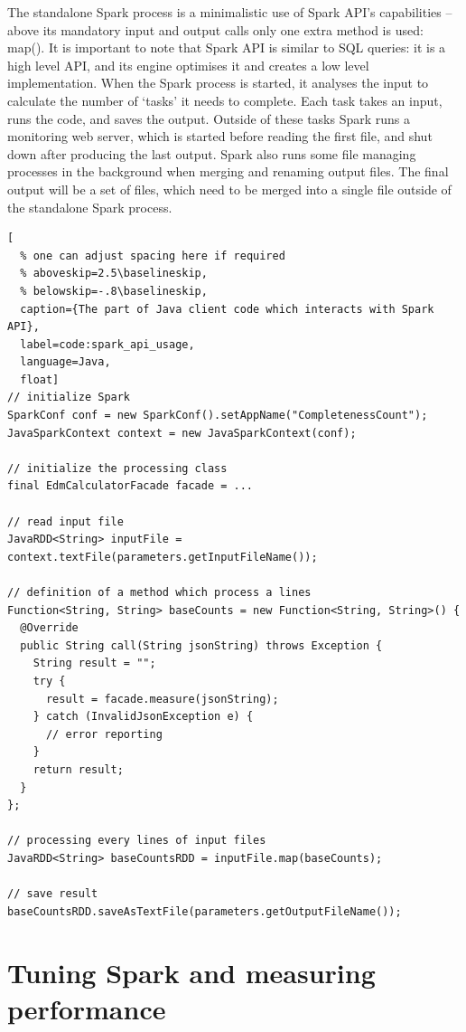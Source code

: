 The standalone Spark process is a minimalistic use of Spark API's capabilities -- above its mandatory input and output calls only one extra method is used: map(). It is important to note that Spark API is similar to SQL queries: it is a high level API, and its engine optimises it and creates a low level implementation. When the Spark process is started, it analyses the input to calculate the number of `tasks' it needs to complete. Each task takes an input, runs the code, and saves the output. Outside of these tasks Spark runs a monitoring web server, which is started before reading the first file, and shut down after producing the last output. Spark also runs some file managing processes in the background when merging and renaming output files. The final output will be a set of files, which need to be merged into a single file outside of the standalone Spark process.

\begin{lstlisting}[
  % one can adjust spacing here if required
  % aboveskip=2.5\baselineskip,
  % belowskip=-.8\baselineskip,
  caption={The part of Java client code which interacts with Spark API},
  label=code:spark_api_usage,
  language=Java,
  float]
// initialize Spark
SparkConf conf = new SparkConf().setAppName("CompletenessCount");
JavaSparkContext context = new JavaSparkContext(conf);

// initialize the processing class
final EdmCalculatorFacade facade = ... 

// read input file
JavaRDD<String> inputFile = context.textFile(parameters.getInputFileName());

// definition of a method which process a lines
Function<String, String> baseCounts = new Function<String, String>() {
  @Override
  public String call(String jsonString) throws Exception {
    String result = "";
    try {
      result = facade.measure(jsonString);
    } catch (InvalidJsonException e) {
      // error reporting
    }
    return result;
  }
};

// processing every lines of input files
JavaRDD<String> baseCountsRDD = inputFile.map(baseCounts);

// save result
baseCountsRDD.saveAsTextFile(parameters.getOutputFileName());
\end{lstlisting}

\section{Tuning Spark and measuring performance}

